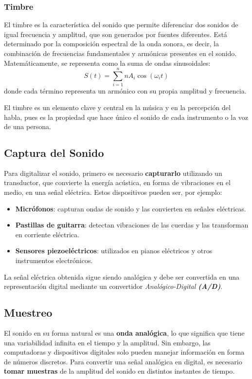 \subsubsection{Timbre}
El timbre es la característica del sonido que permite diferenciar dos sonidos de igual frecuencia y amplitud, que son generados por fuentes diferentes. Está determinado por la composición espectral de la onda sonora, es decir, la combinación de frecuencias fundamentales y armónicas presentes en el sonido. Matemáticamente, se representa como la suma de ondas sinusoidales:
\begin{equation}
    S(t) = \sum_{i=1}^{n}n A_i \cos(\omega_i t)
\end{equation}
donde cada término representa un armónico con su propia amplitud y frecuencia.

El timbre es un elemento clave y central en la música y en la percepción del habla, pues es la propiedad que hace único el sonido de cada instrumento o la voz de una persona.

\subsection{Captura del Sonido}
Para digitalizar el sonido, primero es necesario \textbf{capturarlo} utilizando un transductor, que convierte la energía acústica, en forma de vibraciones en el medio, en una señal eléctrica. Estos dispositivos pueden ser, por ejemplo:

\begin{itemize}
    \item \textbf{Micrófonos}: capturan ondas de sonido y las convierten en señales eléctricas.
    \item \textbf{Pastillas de guitarra}: detectan vibraciones de las cuerdas y las transforman en corriente eléctrica.
    \item \textbf{Sensores piezoeléctricos}: utilizados en pianos eléctricos y otros instrumentos electrónicos.
\end{itemize}

La señal eléctrica obtenida sigue siendo analógica y debe ser convertida en una representación digital mediante un convertidor \emph{Analógico-Digital \textbf{(A/D)}}.

\subsection{Muestreo}
El sonido en su forma natural es una \textbf{onda analógica}, lo que significa que tiene una variabilidad infinita en el tiempo y la amplitud. Sin embargo, las computadoras y dispositivos digitales solo pueden manejar información en forma de números discretos. Para convertir una señal analógica en digital, es necesario \textbf{tomar muestras} de la amplitud del sonido en distintos instantes de tiempo.

